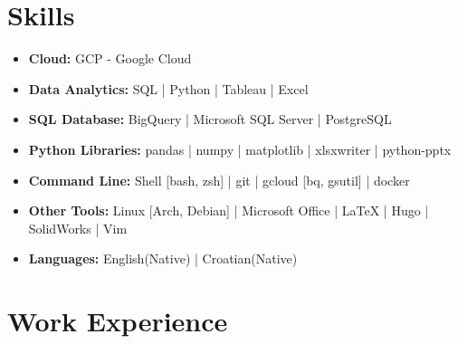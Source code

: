 \documentclass[a4paper,9pt]{article}
\begin{document}
\section*{Skills}
\begin{itemize}[noitemsep]
    \item[] \faCloud \hspace{1mm} \textbf{Cloud:} \hspace{16.7mm} GCP - Google Cloud
    \item[] \faTachometer \hspace{1mm} \textbf{Data Analytics:} \hspace{3.5mm}  SQL |  Python | Tableau |  Excel
    \item[] \faDatabase \hspace{1mm} \textbf{SQL Database:} \hspace{4.4mm} BigQuery |  Microsoft SQL Server |  PostgreSQL
    \item[] \faCog \hspace{1mm} \textbf{Python Libraries:} \hspace{0.4mm} pandas | numpy | matplotlib | xlsxwriter | python-pptx
    \item[] \faTerminal \hspace{1mm} \textbf{Command Line:} \hspace{2.5mm} Shell [bash, zsh] | git |  gcloud [bq, gsutil] | docker
    \item[] \faWrench \hspace{1mm} \textbf{Other Tools:} \hspace{8mm}  Linux [Arch, Debian] | Microsoft Office |  LaTeX  | Hugo | SolidWorks | Vim
    \item[] \faLanguage \hspace{1mm} \textbf{Languages:} \hspace{9.5mm} English(Native) |  Croatian(Native)
\end{itemize}

\section*{Work Experience}
\end{document}
